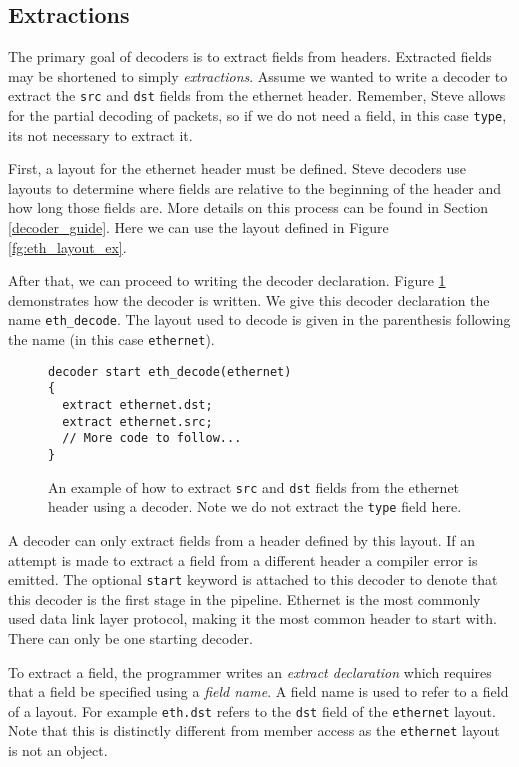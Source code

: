 \subsection{Extractions} \label{decoder_extract_tut}

The primary goal of decoders is to extract fields from headers. Extracted fields may be shortened to simply \textit{extractions}. Assume we wanted to write a decoder to extract the \texttt{src} and \texttt{dst} fields from the ethernet header. Remember, Steve allows for the partial decoding of packets, so if we do not need a field, in this case \texttt{type}, its not necessary to extract it. 

First, a layout for the ethernet header must be defined. Steve decoders use layouts to determine where fields are relative to the beginning of the header and how long those fields are. More details on this process can be found in Section \ref{decoder_guide}. Here we can use the layout defined in Figure \ref{fg:eth_layout_ex}. 

After that, we can proceed to writing the decoder declaration. Figure \ref{fg:extract_ex} demonstrates how the decoder is written. We give this decoder declaration the name \texttt{eth\_decode}. The layout used to decode is given in the parenthesis following the name (in this case \texttt{ethernet}).

\begin{figure}[ht]
\begin{lstlisting}
decoder start eth_decode(ethernet)
{
  extract ethernet.dst;
  extract ethernet.src;
  // More code to follow...
}
\end{lstlisting}
\caption{An example of how to extract \texttt{src} and \texttt{dst} fields from the ethernet header using a decoder. Note we do not extract the \texttt{type} field here.}
\label{fg:extract_ex}
\end{figure}

A decoder can only extract fields from a header defined by this layout. If an attempt is made to extract a field from a different header a compiler error is emitted. The optional \texttt{start} keyword is attached to this decoder to denote that this decoder is the first stage in the pipeline. Ethernet is the most commonly used data link layer protocol, making it the most common header to start with. There can only be one starting decoder.

To extract a field, the programmer writes an \textit{extract declaration} which requires that a field be specified using a \textit{field name}. A field name is used to refer to a field of a layout. For example \texttt{eth.dst} refers to the \texttt{dst} field of the \texttt{ethernet} layout.  Note that this is distinctly different from member access as the \texttt{ethernet} layout is not an object. 

